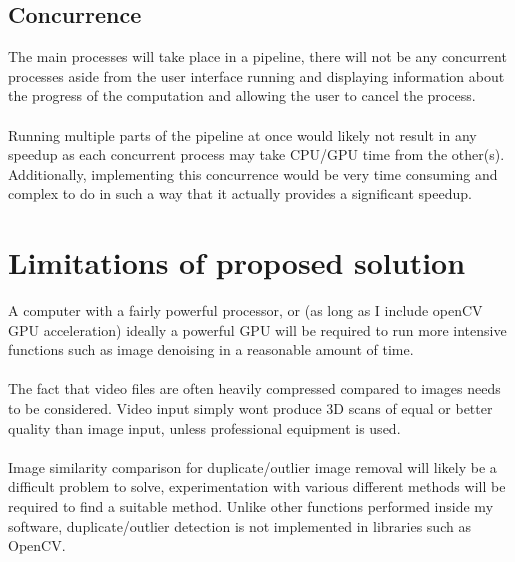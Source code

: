 \documentclass[11pt]{report}
\begin{document}
\subsection{Concurrence}
The main processes will take place in a pipeline, there will not be any concurrent processes aside from the user interface running and displaying information about the progress of the computation and allowing the user to cancel the process.\\\\
Running multiple parts of the pipeline at once would likely not result in any speedup as each concurrent process may take CPU/GPU time from the other(s). Additionally, implementing this concurrence would be very time consuming and complex to do in such a way that it actually provides a significant speedup.

\section{Limitations of proposed solution}
A computer with a fairly powerful processor, or (as long as I include openCV GPU acceleration) ideally a powerful GPU will be required to run more intensive functions such as image denoising in a reasonable amount of time.\\\\
The fact that video files are often heavily compressed compared to images needs to be considered. Video input simply wont produce 3D scans of equal or better quality than image input, unless professional equipment is used.\\\\
Image similarity comparison for duplicate/outlier image removal will likely be a difficult problem to solve, experimentation with various different methods will be required to find a suitable method. Unlike other functions performed inside my software, duplicate/outlier detection is not implemented in libraries such as OpenCV.
\end{document}
